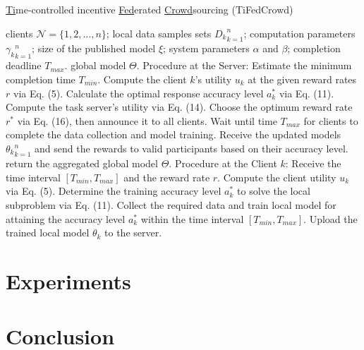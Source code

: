 \documentclass[final,1p,times]{elsarticle}
\begin{document}
\begin{algorithm}[H]
	\caption{\underline {Ti}me-controlled incentive \underline{Fed}erated \underline{Crowd}sourcing (TiFedCrowd)}
	\label{Algo1}
	\begin{algorithmic}[1]
		\REQUIRE clients $\bm{\mathcal{N}} = \{1,2,\dots,n\}$; local data samples sets ${D_k}_{k=1}^n$; computation
		parameters ${\gamma_k}_{k=1}^n$; size of the published model $\xi$;  system parameters $\alpha$ and $\beta$; completion deadline $T_{max}$.
		\ENSURE  global model $\Theta$.
		\STATE Procedure at the Server:
		\STATE Estimate the minimum completion time $T_{min}$.
		\STATE Compute the client $k$’s utility $u_k$ at the given reward rates $r$ via Eq. (5).
		\STATE Calculate the optimal response accuracy level $a_k^\ast$ via Eq. (11).
		\ENDIF
		\ENDFOR
		\STATE Compute the task server’s utility via Eq. (14).
		\STATE Choose the optimum reward rate $r^\ast$ via Eq. (16), then announce it to all clients.
		\STATE Wait until time $T_{max}$ for clients to complete the data collection and model training.
		\STATE Receive the updated models ${\theta_k}_{k=1}^n$ and send the rewards to valid participants based on their accuracy level.
		\STATE return the aggregated global model $\Theta$.
		\STATE Procedure at the Client $k$:
		\STATE Receive the time interval $[T_{min},T_{max}]$ and the reward rate $r$.
		\STATE Compute the client utility $u_k$ via Eq. (5).
		\STATE Determine the training accuracy level $a_k^\ast$
		to solve the local subproblem via Eq. (11).
		\STATE Collect the required data and train local model for attaining the accuracy level $a_k^\ast$ within the time interval $[T_{min},T_{max}]$.
		\STATE Upload the trained local model $\theta_k$ to the server.
	\end{algorithmic}
\end{algorithm}
\section{Experiments} \label{sec:exp}
\section{Conclusion} \label{sec:con}


\end{document}
